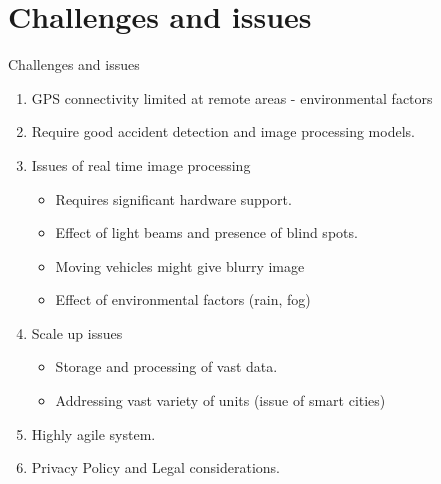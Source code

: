 \documentclass{beamer}
\begin{document}
	\section{Challenges and issues}
	\begin{frame}{Challenges and issues}
		\begin{enumerate}
			\item GPS connectivity limited at remote areas - environmental factors
			\item Require good accident detection and image processing models.
			\item Issues of real time image processing
			\begin{itemize}
				\item Requires significant hardware support.	
				\item Effect of light beams and presence of blind spots.
				\item Moving vehicles might give blurry image
				\item Effect of environmental factors (rain, fog)
			\end{itemize}
			\item Scale up issues
			\begin{itemize}
				\item Storage and processing of vast data.
				\item Addressing vast variety of units (issue of smart cities)	
			\end{itemize}
			\item Highly agile system.
			\item Privacy Policy and Legal considerations.
		\end{enumerate}
	\end{frame}
	
	
	
	
\end{document}
